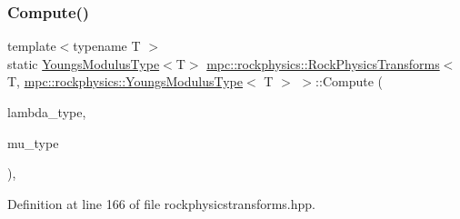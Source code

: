 \subsubsection{\texorpdfstring{Compute()}{Compute()}\hspace{0.1cm}{\footnotesize\ttfamily [1/6]}}
{\footnotesize\ttfamily template$<$typename T $>$ \\
static \mbox{\hyperlink{structmpc_1_1rockphysics_1_1_youngs_modulus_type}{Youngs\+Modulus\+Type}}$<$T$>$ \mbox{\hyperlink{structmpc_1_1rockphysics_1_1_rock_physics_transforms}{mpc\+::rockphysics\+::\+Rock\+Physics\+Transforms}}$<$ T, \mbox{\hyperlink{structmpc_1_1rockphysics_1_1_youngs_modulus_type}{mpc\+::rockphysics\+::\+Youngs\+Modulus\+Type}}$<$ T $>$ $>$\+::Compute (\begin{DoxyParamCaption}\item[{const \mbox{\hyperlink{structmpc_1_1rockphysics_1_1_lame_paramter_modulus_type}{mpc\+::rockphysics\+::\+Lame\+Paramter\+Modulus\+Type}}$<$ T $>$ \&}]{lambda\+\_\+type,  }\item[{const \mbox{\hyperlink{structmpc_1_1rockphysics_1_1_shear_modulus_type}{mpc\+::rockphysics\+::\+Shear\+Modulus\+Type}}$<$ T $>$ \&}]{mu\+\_\+type }\end{DoxyParamCaption})\hspace{0.3cm}{\ttfamily [inline]}, {\ttfamily [static]}}



Definition at line 166 of file rockphysicstransforms.\+hpp.

\mbox{\label{structmpc_1_1rockphysics_1_1_rock_physics_transforms_3_01_t_00_01mpc_1_1rockphysics_1_1_youngs_modulus_type_3_01_t_01_4_01_4_a4642c2d4d7a1d8f791802de9edcba714}} 
